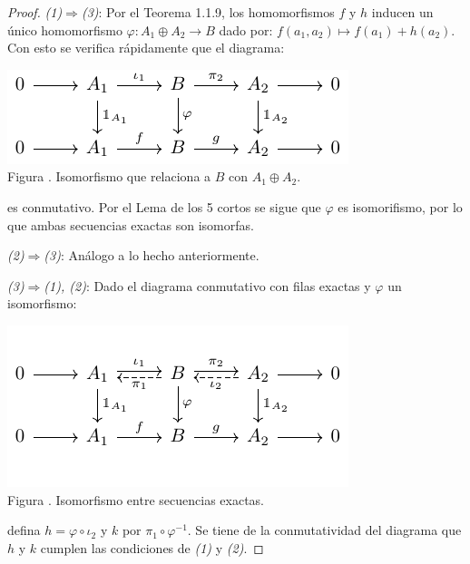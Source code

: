 \documentclass[12pt]{report}
\newcounter{it}
\theoremstyle{largebreak}
\newcommand\cf[3]{\ensuremath{#1:#2\rightarrow#3}}
\begin{document}
    \begin{proof}
        \textit{(1)}$\Rightarrow$\textit{(3)}: Por el Teorema 1.1.9, los homomorfismos $f$ y $h$ inducen un único homomorfismo $\cf{\varphi}{A_1\oplus A_2}{B}$ dado por: $f(a_1,a_2)\mapsto f(a_1)+h(a_2)$. Con esto se verifica rápidamente que el diagrama:

        \begin{minipage}{\textwidth}
            \begin{center}
                \includegraphics[scale=1.5]{images/fig_4.pdf}\\
                Figura \thefigcount. Isomorfismo que relaciona a $B$ con $A_1\oplus A_2$.
            \end{center}
        \end{minipage}

        es conmutativo. Por el Lema de los 5 cortos se sigue que $\varphi$ es isomorifismo, por lo que ambas secuencias exactas son isomorfas.

        \textit{(2)}$\Rightarrow$\textit{(3)}: Análogo a lo hecho anteriormente.

        \textit{(3)}$\Rightarrow$\textit{(1), (2)}: Dado el diagrama conmutativo con filas exactas y $\varphi$ un isomorfismo:
        
        \begin{minipage}{\textwidth}
            \begin{center}
                \includegraphics[scale=1.5]{images/fig_5.pdf}\\
                Figura \thefigcount. Isomorfismo entre secuencias exactas.
            \end{center}
        \end{minipage}

        defina $h=\varphi\circ\iota_2$ y $k$ por $\pi_1\circ\varphi^{-1}$. Se tiene de la conmutatividad del diagrama que $h$ y $k$ cumplen las condiciones de \textit{(1)} y \textit{(2)}.
    \end{proof}
\end{document}
